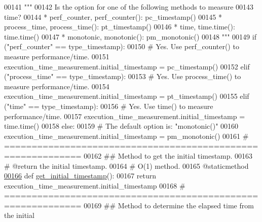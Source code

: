 \begin{DoxyCode}
00141         \textcolor{stringliteral}{"""}
00142 \textcolor{stringliteral}{            Is the option for one of the following methods to measure}
00143 \textcolor{stringliteral}{                time?}
00144 \textcolor{stringliteral}{                * perf\_counter, perf\_counter(): pc\_timestamp()}
00145 \textcolor{stringliteral}{                * process\_time, process\_time(): pt\_timestamp()}
00146 \textcolor{stringliteral}{                * time, time.time(): time.time()}
00147 \textcolor{stringliteral}{                * monotonic, monotonic(): pm\_monotonic()}
00148 \textcolor{stringliteral}{        """}
00149         \textcolor{keywordflow}{if} (\textcolor{stringliteral}{"perf\_counter"} == type\_timestamp):
00150             \textcolor{comment}{# Yes. Use perf\_counter() to measure performance/time.}
00151             execution\_time\_measurement.initial\_timestamp = pc\_timestamp()
00152         \textcolor{keywordflow}{elif} (\textcolor{stringliteral}{"process\_time"} == type\_timestamp):
00153             \textcolor{comment}{# Yes. Use process\_time() to measure performance/time.}
00154             execution\_time\_measurement.initial\_timestamp = pt\_timestamp()
00155         \textcolor{keywordflow}{elif} (\textcolor{stringliteral}{"time"} == type\_timestamp):
00156             \textcolor{comment}{# Yes. Use time() to measure performance/time.}
00157             execution\_time\_measurement.initial\_timestamp = time.time()
00158         \textcolor{keywordflow}{else}:
00159             \textcolor{comment}{# The default option is: "monotonic()"}
00160             execution\_time\_measurement.initial\_timestamp = pm\_monotonic()
00161     \textcolor{comment}{# ============================================================}
00162     \textcolor{comment}{##  Method to get the initial timestamp.}
00163     \textcolor{comment}{#   @return the initial timestamp.}
00164     \textcolor{comment}{#   O(1) method.}
00165     @staticmethod
\hypertarget{performance__measurement__no__ns_8py_source_l00166}{}\hyperlink{classutilities_1_1timing__measurements_1_1performance__measurement__no__ns_1_1execution__time__measurement_af12752f53bfd297b66b504170b9e3655}{00166}     \textcolor{keyword}{def }\hyperlink{classutilities_1_1timing__measurements_1_1performance__measurement__no__ns_1_1execution__time__measurement_af12752f53bfd297b66b504170b9e3655}{get\_initial\_timestamp}():
00167         \textcolor{keywordflow}{return} execution\_time\_measurement.initial\_timestamp
00168     \textcolor{comment}{# ============================================================}
00169     \textcolor{comment}{##  Method to determine the elapsed time from the initial}

\end{DoxyCode}
